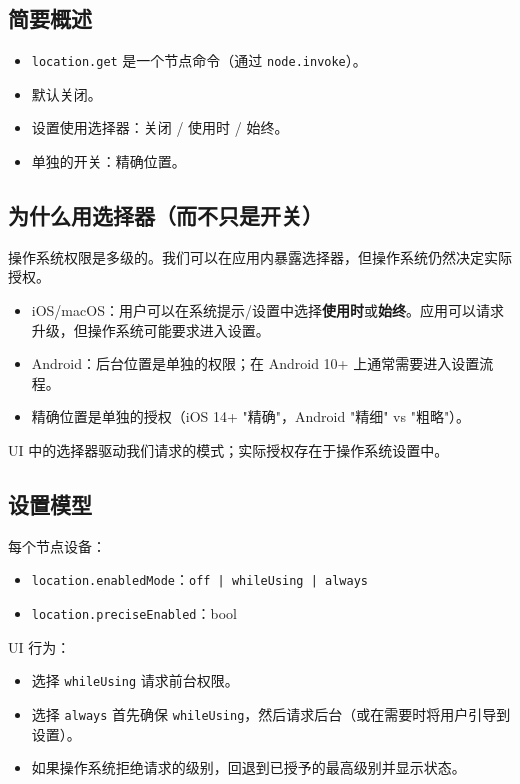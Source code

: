 \subsection{简要概述}


\begin{itemize}
  \item \texttt{location.get} 是一个节点命令（通过 \texttt{node.invoke}）。
  \item 默认关闭。
  \item 设置使用选择器：关闭 / 使用时 / 始终。
  \item 单独的开关：精确位置。
\end{itemize}


\subsection{为什么用选择器（而不只是开关）}


操作系统权限是多级的。我们可以在应用内暴露选择器，但操作系统仍然决定实际授权。

\begin{itemize}
  \item iOS/macOS：用户可以在系统提示/设置中选择\textbf{使用时}或\textbf{始终}。应用可以请求升级，但操作系统可能要求进入设置。
  \item Android：后台位置是单独的权限；在 Android 10+ 上通常需要进入设置流程。
  \item 精确位置是单独的授权（iOS 14+ "精确"，Android "精细" vs "粗略"）。
\end{itemize}


UI 中的选择器驱动我们请求的模式；实际授权存在于操作系统设置中。

\subsection{设置模型}


每个节点设备：

\begin{itemize}
  \item \texttt{location.enabledMode}：\texttt{off | whileUsing | always}
  \item \texttt{location.preciseEnabled}：bool
\end{itemize}


UI 行为：

\begin{itemize}
  \item 选择 \texttt{whileUsing} 请求前台权限。
  \item 选择 \texttt{always} 首先确保 \texttt{whileUsing}，然后请求后台（或在需要时将用户引导到设置）。
  \item 如果操作系统拒绝请求的级别，回退到已授予的最高级别并显示状态。
\end{itemize}


